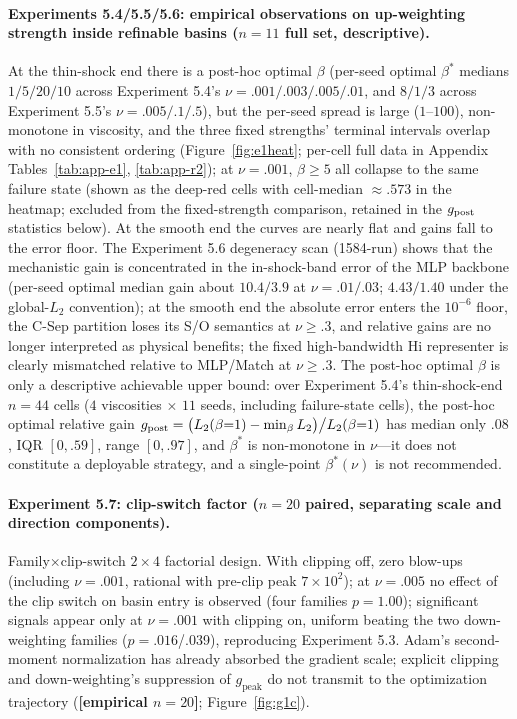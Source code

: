 \documentclass[11pt]{article}
\numberwithin{equation}{section}
\begin{document}
\paragraph{Experiments 5.4/5.5/5.6: empirical observations on up-weighting strength inside refinable basins ($n=11$ full set, descriptive).}
At the thin-shock end there is a post-hoc optimal $\beta$ (per-seed optimal $\beta^*$ medians $1/5/20/10$ across Experiment 5.4's $\nu=.001/.003/.005/.01$, and $8/1/3$ across Experiment 5.5's $\nu=.005/.1/.5$), but the per-seed spread is large ($1$--$100$), non-monotone in viscosity, and the three fixed strengths' terminal intervals overlap with no consistent ordering (Figure~\ref{fig:e1heat}; per-cell full data in Appendix Tables~\ref{tab:app-e1}, \ref{tab:app-r2}); at $\nu=.001$, $\beta\ge5$ all collapse to the same failure state (shown as the deep-red cells with cell-median $\approx.573$ in the heatmap; excluded from the fixed-strength comparison, retained in the $g_{\rm post}$ statistics below). At the smooth end the curves are nearly flat and gains fall to the error floor. The Experiment 5.6 degeneracy scan (1584-run) shows that the mechanistic gain is concentrated in the in-shock-band error of the MLP backbone (per-seed optimal median gain about $10.4/3.9$ at $\nu=.01/.03$; $4.43/1.40$ under the global-$L_2$ convention); at the smooth end the absolute error enters the $10^{-6}$ floor, the C-Sep partition loses its S/O semantics at $\nu\ge.3$, and relative gains are no longer interpreted as physical benefits; the fixed high-bandwidth Hi representer is clearly mismatched relative to MLP/Match at $\nu\ge.3$. The post-hoc optimal $\beta$ is only a descriptive achievable upper bound: over Experiment 5.4's thin-shock-end $n=44$ cells ($4$ viscosities $\times$ $11$ seeds, including failure-state cells), the post-hoc optimal relative gain $g_{\rm post}=\big(L_2(\beta{=}1)-\min_\beta L_2\big)\big/L_2(\beta{=}1)$ has median only $.08$, IQR $[0,.59]$, range $[0,.97]$, and $\beta^*$ is non-monotone in $\nu$---it does not constitute a deployable strategy, and a single-point $\beta^*(\nu)$ is not recommended.

\paragraph{Experiment 5.7: clip-switch factor ($n=20$ paired, separating scale and direction components).}
Family$\times$clip-switch $2\times4$ factorial design. With clipping off, zero blow-ups (including $\nu=.001$, rational with pre-clip peak $7\times10^2$); at $\nu=.005$ no effect of the clip switch on basin entry is observed (four families $p=1.00$); significant signals appear only at $\nu=.001$ with clipping on, uniform beating the two down-weighting families ($p=.016$/.039), reproducing Experiment 5.3. Adam's second-moment normalization has already absorbed the gradient scale; explicit clipping and down-weighting's suppression of $g_{\text{peak}}$ do not transmit to the optimization trajectory (\textbf{[empirical $n=20$]}; Figure~\ref{fig:g1c}).
\end{document}
